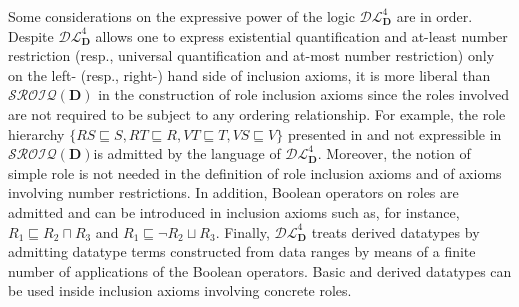\documentclass[a4paper]{llncs}
\newcommand{\shdlss}{\mathcal{DL}_{\D}^{4}}
\newcommand{\sroiqd}{\ensuremath{\mathcal{SROIQ}(\D)}}
\newcommand{\D}{\mathbf{D}}
\begin{document}
Some considerations on the expressive power of the logic $\shdlss$ are in order. Despite $\shdlss$ allows one to express existential quantification and at-least number restriction (resp., universal quantification and at-most number restriction) only on the left- (resp., right-) hand side of inclusion axioms, it is more liberal than \sroiqd\space
in the construction of role inclusion axioms since the roles involved are not required to be subject to any ordering relationship. For example, the role hierarchy $\{RS \sqsubseteq S,  RT \sqsubseteq R, VT \sqsubseteq T, VS \sqsubseteq V\}$ presented in \cite{Horrocks2006} and not expressible in \sroiqd\space is admitted by the language of $\shdlss$. Moreover, the notion of simple role is not needed in the definition of role inclusion axioms and of axioms involving number restrictions. In addition, Boolean operators on roles are admitted and can be introduced in inclusion axioms such as, for instance, $R_1 \sqsubseteq R_2 \sqcap R_3$ and $R_1 \sqsubseteq \neg R_2 \sqcup R_3$. Finally, $\shdlss$ treats derived datatypes by admitting datatype terms constructed from data ranges by means of a finite number of applications of the Boolean operators. Basic and derived datatypes can be used inside inclusion axioms involving concrete roles.
\end{document}
